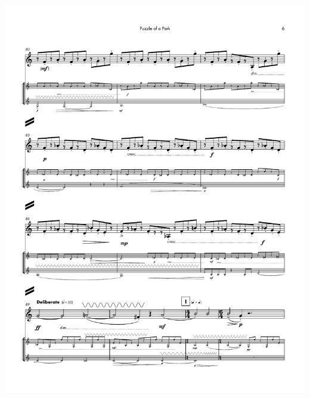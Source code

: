     \begin{center}
    \includegraphics[scale=0.75]{Scores/puzzlePart11.pdf}
    \end{center}
    \newpage
